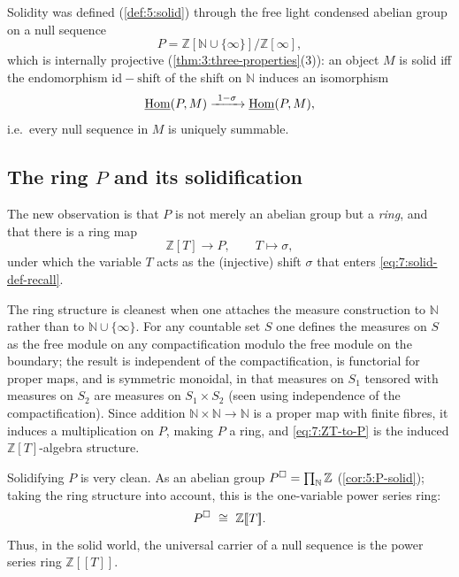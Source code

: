 Solidity was defined (\cref{def:5:solid}) through the free light condensed
abelian group on a null sequence
\begin{equation*}
P=\mathbb{Z}[\mathbb{N}\cup\{\infty\}]\big/\mathbb{Z}[\infty],
\end{equation*}
which is internally projective (\cref{thm:3:three-properties}(3)): an object
$M$ is solid iff the endomorphism $\mathrm{id}-\mathrm{shift}$ of the shift on
$\mathbb{N}$ induces an isomorphism
\begin{equation}
\label{eq:7:solid-def-recall}
\underline{\operatorname{Hom}}(P,M)\xrightarrow{\ 1-\sigma\ }\underline{\operatorname{Hom}}(P,M),
\end{equation}
i.e.\ every null sequence in $M$ is uniquely summable.

\subsection{The ring \texorpdfstring{$P$}{P} and its solidification}

The new observation is that $P$ is not merely an abelian group but a
\emph{ring}, and that there is a ring map
\begin{equation}
\label{eq:7:ZT-to-P}
\mathbb{Z}[T]\longrightarrow P,\qquad T\longmapsto\sigma,
\end{equation}
under which the variable $T$ acts as the (injective) shift $\sigma$ that
enters \eqref{eq:7:solid-def-recall}.

\begin{remark}
\label{rmk:7:P-ring}
The ring structure is cleanest when one attaches the measure construction to
$\mathbb{N}$ rather than to $\mathbb{N}\cup\{\infty\}$. For any countable set
$S$ one defines the measures on $S$ as the free module on any compactification
modulo the free module on the boundary; the result is independent of the
compactification, is functorial for proper maps, and is symmetric monoidal, in
that measures on $S_1$ tensored with measures on $S_2$ are measures on
$S_1\times S_2$ (seen using independence of the compactification). Since
addition $\mathbb{N}\times\mathbb{N}\to\mathbb{N}$ is a proper map with finite
fibres, it induces a multiplication on $P$, making $P$ a ring, and
\eqref{eq:7:ZT-to-P} is the induced $\mathbb{Z}[T]$-algebra structure.
\end{remark}

Solidifying $P$ is very clean. As an abelian group $P^{\square}
=\prod_{\mathbb{N}}\mathbb{Z}$ (\cref{cor:5:P-solid}); taking the ring
structure into account, this is the one-variable power series ring:
\begin{equation*}
P^{\solid}\ \cong\ \mathbb{Z}[\![T]\!].
\end{equation*}
Thus, in the solid world, the universal carrier of a null sequence is the
power series ring $\mathbb{Z}[\![T]\!]$.

